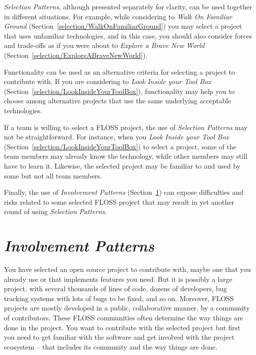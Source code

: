 \documentclass[12pt]{article}
\begin{document}
\textit{Selection Patterns}, although presented separately for clarity, 
can be used together in different situations.
For example, while considering to \textit{Walk On Familiar Ground}
(Section~\ref{selection/WalkOnFamiliarGround}) 
you may select a project that uses unfamiliar technologies, 
and in this case, you should also consider  forces and
trade-offs as if you were about to \emph{Explore a Brave New World}
(Section~\ref{selection/ExploreABraveNewWorld}).

Functionality can be used as an alternative criteria for selecting a project to
contribute with. If you are considering to
\textit{Look Inside your Tool Box} (Section~\ref{selection/LookInsideYourToolBox}),
functionality may help you to choose among alternative projects 
that use the same underlying acceptable technologies.

If a team is willing to select a FLOSS project, 
the use of \textit{Selection Patterns} may not be straightforward.  
For instance, when you 
\textit{Look Inside your Tool Box} (Section~\ref{selection/LookInsideYourToolBox})
to select a project, some of the team members may already know the technology, 
while other members may still have to learn it.
Likewise, the selected project may be familiar to and used by some
but not all team members.

Finally, the use of \textit{Involvement Patterns} (Section~\ref{sec:involvement})
can expose difficulties and risks related to some selected FLOSS project that may
result in yet  another round of using \textit{Selection Patterns}.

\section{\textit{Involvement Patterns}} \label{sec:involvement}

You have selected an open source project to contribute with, 
maybe one that you already use or that implements features you need. 
But it is possibly a large project, with several thousands of lines of code, 
dozens of developers, bug tracking systems with lots of bugs to be fixed, and so on. 
Moreover, FLOSS projects are mostly developed in a public, 
collaborative manner, by a community of contributors.
These FLOSS communities often determine the way things are done in the project.
You want to contribute with the selected project but first you need to get familiar 
with the software and get involved with the project ecosystem -- that 
includes its community and the way things are done.
\end{document}
